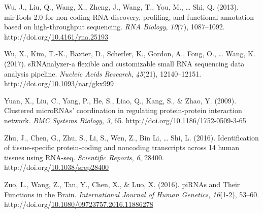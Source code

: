 \documentclass[12pt,twoside]{reedthesis}
\newlength{\cslhangindent}
\newenvironment{CSLReferences}[2] %
 {%
  \setlength{\parindent}{0pt}
  \ifodd #1 \everypar{\setlength{\hangindent}{\cslhangindent}}\ignorespaces\fi
  \ifnum #2 > 0
  \setlength{\parskip}{#2\baselineskip}
  \fi
 }%
 {}
\begin{document}
\begin{CSLReferences}{1}{0}
\leavevmode{}%
Wu, J., Liu, Q., Wang, X., Zheng, J., Wang, T., You, M., \ldots{} Shi, Q. (2013). mirTools 2.0 for non-coding RNA discovery, profiling, and functional annotation based on high-throughput sequencing. \emph{RNA Biology}, \emph{10}(7), 1087--1092. http://doi.org/\href{https://doi.org/10.4161/rna.25193}{10.4161/rna.25193}

\leavevmode{}%
Wu, X., Kim, T.-K., Baxter, D., Scherler, K., Gordon, A., Fong, O., \ldots{} Wang, K. (2017). sRNAnalyzer-a flexible and customizable small RNA sequencing data analysis pipeline. \emph{Nucleic Acids Research}, \emph{45}(21), 12140--12151. http://doi.org/\href{https://doi.org/10.1093/nar/gkx999}{10.1093/nar/gkx999}

\leavevmode{}%
Yuan, X., Liu, C., Yang, P., He, S., Liao, Q., Kang, S., \& Zhao, Y. (2009). Clustered microRNAs' coordination in regulating protein-protein interaction network. \emph{BMC Systems Biology}, \emph{3}, 65. http://doi.org/\href{https://doi.org/10.1186/1752-0509-3-65}{10.1186/1752-0509-3-65}

\leavevmode{}%
Zhu, J., Chen, G., Zhu, S., Li, S., Wen, Z., Bin Li, \ldots{} Shi, L. (2016). Identification of tissue-specific protein-coding and noncoding transcripts across 14 human tissues using RNA-seq. \emph{Scientific Reports}, \emph{6}, 28400. http://doi.org/\href{https://doi.org/10.1038/srep28400}{10.1038/srep28400}

\leavevmode{}%
Zuo, L., Wang, Z., Tan, Y., Chen, X., \& Luo, X. (2016). piRNAs and Their Functions in the Brain. \emph{International Journal of Human Genetics}, \emph{16}(1-2), 53--60. http://doi.org/\href{https://doi.org/10.1080/09723757.2016.11886278}{10.1080/09723757.2016.11886278}

\end{CSLReferences}

\end{document}
